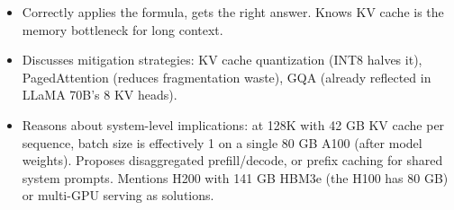 \begin{interviewq}
\goodgreat
\begin{itemize}
    \item {} Correctly applies the formula, gets the right answer. Knows KV cache is the memory bottleneck for long context.
    \item {} Discusses mitigation strategies: KV cache quantization (INT8 halves it), PagedAttention (reduces fragmentation waste), GQA (already reflected in LLaMA 70B's 8 KV heads).
    \item {} Reasons about system-level implications: at 128K with 42 GB KV cache per sequence, batch size is effectively 1 on a single 80 GB A100 (after model weights). Proposes disaggregated prefill/decode, or prefix caching for shared system prompts. Mentions H200 with 141 GB HBM3e (the H100 has 80 GB) or multi-GPU serving as solutions.
\end{itemize}

\end{interviewq}

